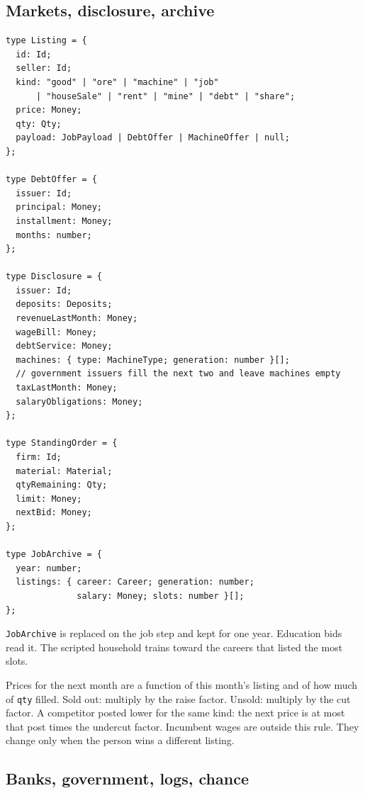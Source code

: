 \documentclass[11pt]{article}
\newenvironment{keep}{\noindent\begin{minipage}{\linewidth}}{\end{minipage}}
\begin{document}
\subsection{Markets, disclosure, archive}

\begin{keep}
\begin{lstlisting}
type Listing = {
  id: Id;
  seller: Id;
  kind: "good" | "ore" | "machine" | "job"
      | "houseSale" | "rent" | "mine" | "debt" | "share";
  price: Money;
  qty: Qty;
  payload: JobPayload | DebtOffer | MachineOffer | null;
};

type DebtOffer = {
  issuer: Id;
  principal: Money;
  installment: Money;
  months: number;
};

type Disclosure = {
  issuer: Id;
  deposits: Deposits;
  revenueLastMonth: Money;
  wageBill: Money;
  debtService: Money;
  machines: { type: MachineType; generation: number }[];
  // government issuers fill the next two and leave machines empty
  taxLastMonth: Money;
  salaryObligations: Money;
};

type StandingOrder = {
  firm: Id;
  material: Material;
  qtyRemaining: Qty;
  limit: Money;
  nextBid: Money;
};

type JobArchive = {
  year: number;
  listings: { career: Career; generation: number;
              salary: Money; slots: number }[];
};
\end{lstlisting}
\end{keep}

\texttt{JobArchive} is replaced on the job step and kept for one year.
Education bids read it. The scripted household trains toward the careers
that listed the most slots.

Prices for the next month are a function of this month's listing and of how
much of \texttt{qty} filled. Sold out: multiply by the raise factor.
Unsold: multiply by the cut factor. A competitor posted lower for the same
kind: the next price is at most that post times the undercut factor.
Incumbent wages are outside this rule. They change only when the person
wins a different listing.

\subsection{Banks, government, logs, chance}
\end{document}
